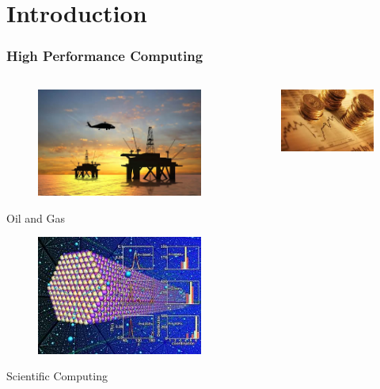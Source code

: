 \section{Introduction}

\begin{frame}
  \frametitle{High Performance Computing}
  \begin{columns}
    \begin{center}
      \begin{figure}
        \includegraphics[scale=0.2]{figs/oil-gas-industry.jpg}\\
      \end{figure}
      \vspace{0.5cm}
      Oil and Gas
      \begin{figure}
        \includegraphics[scale=0.3]{figs/scientific-computing.jpg}\\
      \end{figure}
      Scientific Computing
    \end{center}
    \begin{center}
      \begin{figure}
        \includegraphics[scale=0.31]{figs/finance.jpg}\\

\end{figure}
\end{center}
\end{columns}
\end{frame}
